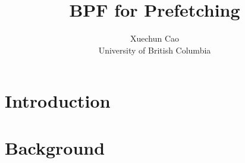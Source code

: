 \documentclass[10pt, twocolumn, letterpaper]{article}
\begin{document}

\date{}

\title{\Large \bf BPF for Prefetching}



\author{
{\rm Xuechun Cao}\\
University of British Columbia\\
} %

\maketitle


\section{Introduction}
\label{sec:introduction}


\section{Background}
\label{sec:background}






\end{document}
